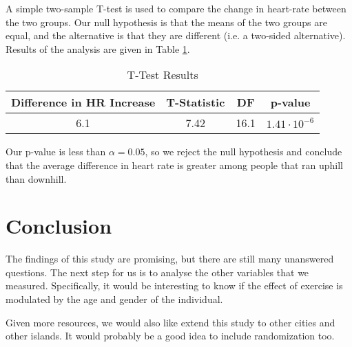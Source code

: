 \documentclass{article}
\begin{document}
A simple two-sample T-test is used to compare the change in heart-rate between the two groups. Our null hypothesis is that the means of the two groups are equal, and the alternative is that they are different (i.e. a two-sided alternative). Results of the analysis are given in Table \ref{T-Test_Results}. 

\begin{table}[t]
\caption{T-Test Results}
\label{T-Test_Results}
\centering
\begin{tabular}{ |c|c|c|c| } 
 \hline
 Difference in HR Increase & T-Statistic & DF & p-value\\
 \hline
 6.1 & 7.42 & 16.1 & $1.41 \cdot 10^{-6}$ \\ 
 \hline
\end{tabular}
\end{table}

Our p-value is less than $\alpha = 0.05$, so we reject the null hypothesis and conclude that the average difference in heart rate is greater among people that ran uphill than downhill.

\section*{Conclusion}

The findings of this study are promising, but there are still many unanswered questions. The next step for us is to analyse the other variables that we measured. Specifically, it would be interesting to know if the effect of exercise is modulated by the age and gender of the individual. 

Given more resources, we would also like extend this study to other cities and other islands. It would probably be a good idea to include randomization too.
\end{document}
